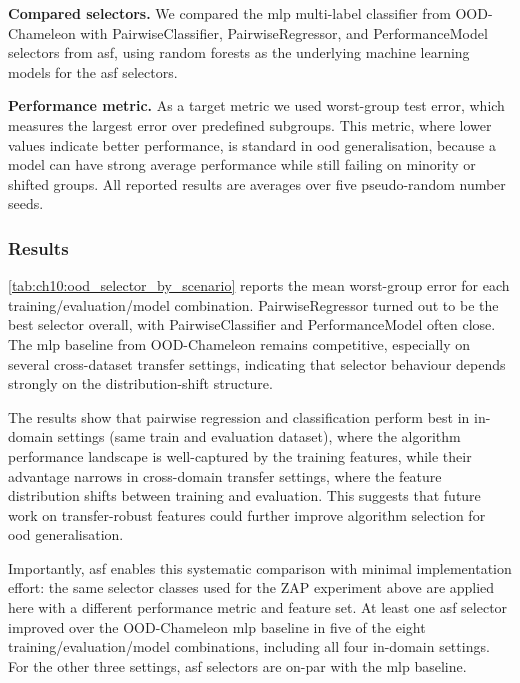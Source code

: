 \textbf{Compared selectors.} We compared the \gls{mlp} multi-label classifier from OOD-Chameleon with PairwiseClassifier, PairwiseRegressor, and PerformanceModel selectors from \gls{asf}, using random forests as the underlying machine learning models for the \gls{asf} selectors.

\textbf{Performance metric.} As a target metric we used worst-group test error, which measures the largest error over predefined subgroups. This metric, where lower values indicate better performance, is standard in \gls{ood} generalisation, because a model can have strong average performance while still failing on minority or shifted groups. All reported results are averages over five pseudo-random number seeds.

\subsubsection{Results}
\cref{tab:ch10:ood_selector_by_scenario} reports the mean worst-group error for each training/evaluation/model combination. PairwiseRegressor turned out to be the best selector overall, with PairwiseClassifier and PerformanceModel often close. The \gls{mlp} baseline from OOD-Chameleon remains competitive, especially on several cross-dataset transfer settings, indicating that selector behaviour depends strongly on the distribution-shift structure.

The results show that pairwise regression and classification perform best in in-domain settings (same train and evaluation dataset), where the algorithm performance landscape is well-captured by the training features, while their advantage narrows in cross-domain transfer settings, where the feature distribution shifts between training and evaluation. This suggests that future work on transfer-robust features could further improve algorithm selection for \gls{ood} generalisation.

Importantly, \gls{asf} enables this systematic comparison with minimal implementation effort: the same selector classes used for the ZAP experiment above are applied here with a different performance metric and feature set. At least one \gls{asf} selector improved over the OOD-Chameleon \gls{mlp} baseline in five of the eight training/evaluation/model combinations, including all four in-domain settings. For the other three settings, \gls{asf} selectors are on-par with the \gls{mlp} baseline.

\begin{table}[t]
\caption[OOD-Chameleon selector errors]{OOD-Chameleon selector matrix. Rows represent training/evaluation/model combinations, columns correspond to selectors, and cells report mean worst-group error $\pm$ standard deviation over the five seeds, in percentage points. Lower is better; bold entries mark the lowest value in a row or values within 0.5 percentage points of it.
    }
\label{tab:ch10:ood_selector_by_scenario}

  \centering


  \resizebox{\textwidth}{!}{}

\end{table}

